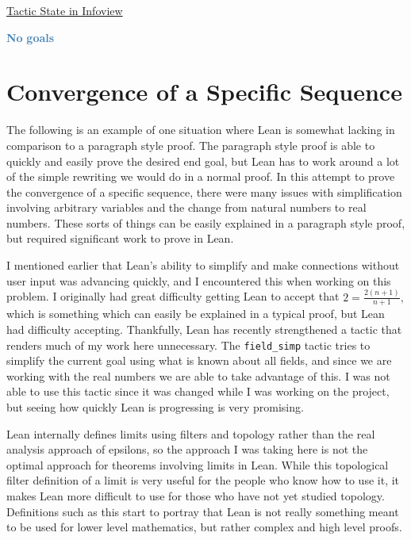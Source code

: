 \documentclass[
  letterpaper,
]{scrreprt}
\newenvironment{Shaded}{\begin{snugshade}}{\end{snugshade}}
\newcommand{\InformationTok}[1]{\textcolor[rgb]{0.37,0.37,0.37}{#1}}
\newcommand{\SpecialStringTok}[1]{\textcolor[rgb]{0.13,0.47,0.30}{#1}}
\renewcommand{\InformationTok}[1]{\textcolor[HTML]{D2691E}{\textbf{#1}}}
\renewcommand{\SpecialStringTok}[1]{\textcolor[HTML]{4682B4}{\textbf{#1}}}
\newcommand{\nobreakShaded}{\renewenvironment{Shaded}
	{\begin{tcolorbox}[frame hidden, enhanced, interior hidden, boxrule=0pt,
		borderline west={3pt}{0pt}{shadecolor}, sharp corners]}
	{\end{tcolorbox}}}
\newenvironment{outpt}
	{\nobreakShaded\begin{minipage}[t]{0.32\textwidth}
		\uline{Tactic State in Infoview}}
	{\end{minipage}}
\theoremstyle{remark}
\begin{document}
\begin{outpt}

\begin{Shaded}
\begin{Highlighting}[]
\SpecialStringTok{No}\InformationTok{ }\SpecialStringTok{goals}
\end{Highlighting}
\end{Shaded}

\end{outpt}

\hypertarget{convergence-of-a-specific-sequence}{%
\section{Convergence of a Specific
Sequence}\label{convergence-of-a-specific-sequence}}

The following is an example of one situation where Lean is somewhat
lacking in comparison to a paragraph style proof. The paragraph style
proof is able to quickly and easily prove the desired end goal, but Lean
has to work around a lot of the simple rewriting we would do in a normal
proof. In this attempt to prove the convergence of a specific sequence,
there were many issues with simplification involving arbitrary variables
and the change from natural numbers to real numbers. These sorts of
things can be easily explained in a paragraph style proof, but required
significant work to prove in Lean.

I mentioned earlier that Lean's ability to simplify and make connections
without user input was advancing quickly, and I encountered this when
working on this problem. I originally had great difficulty getting Lean
to accept that \(2 = \frac{2(n + 1)}{n + 1},\) which is something which
can easily be explained in a typical proof, but Lean had difficulty
accepting. Thankfully, Lean has recently strengthened a tactic that
renders much of my work here unnecessary. The \texttt{field\_simp}
tactic tries to simplify the current goal using what is known about all
fields, and since we are working with the real numbers we are able to
take advantage of this. I was not able to use this tactic since it was
changed while I was working on the project, but seeing how quickly Lean
is progressing is very promising.

Lean internally defines limits using filters and topology rather than
the real analysis approach of epsilons, so the approach I was taking
here is not the optimal approach for theorems involving limits in Lean.
While this topological filter definition of a limit is very useful for
the people who know how to use it, it makes Lean more difficult to use
for those who have not yet studied topology. Definitions such as this
start to portray that Lean is not really something meant to be used for
lower level mathematics, but rather complex and high level proofs.
\end{document}
